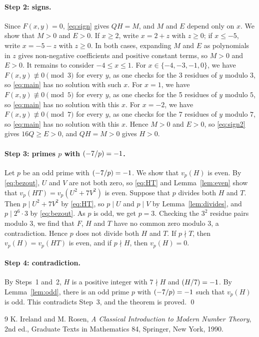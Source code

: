 \documentclass[11pt]{article}
\newcommand{\leg}[2]{\mathchoice{\biggl(\dfrac{#1}{#2}\biggr)}{(#1/#2)}{(#1/#2)}{(#1/#2)}}
\begin{document}
\paragraph{Step 2: signs.} Since $F(x,y)=0$, \eqref{eq:sign} gives $QH=M$, and $M$ and $E$ depend only on $x$. We show that $M>0$ and $E>0$. If $x\geq2$, write $x=2+z$ with $z\geq0$; if $x\leq-5$, write $x=-5-z$ with $z\geq0$. In both cases, expanding $M$ and $E$ as polynomials in $z$ gives non-negative coefficients and positive constant terms, so $M>0$ and $E>0$. It remains to consider $-4\leq x\leq1$. For $x\in\{-4,-3,-1,0\}$, we have $F(x,y)\not\equiv0\pmod{3}$ for every $y$, as one checks for the 3 residues of $y$ modulo $3$, so \eqref{eq:main} has no solution with such $x$. For $x=1$, we have $F(x,y)\not\equiv0\pmod{5}$ for every $y$, as one checks for the 5 residues of $y$ modulo $5$, so \eqref{eq:main} has no solution with this $x$. For $x=-2$, we have $F(x,y)\not\equiv0\pmod{7}$ for every $y$, as one checks for the 7 residues of $y$ modulo $7$, so \eqref{eq:main} has no solution with this $x$. Hence $M>0$ and $E>0$, so \eqref{eq:sign2} gives $16Q\geq E>0$, and $QH=M>0$ gives $H>0$.

\paragraph{\texorpdfstring{Step 3: primes $p$ with $\leg{-7}{p}=-1$.}{Step 3: inert primes.}} Let $p$ be an odd prime with $\leg{-7}{p}=-1$. We show that $v_p(H)$ is even. By \eqref{eq:bezout}, $U$ and $V$ are not both zero, so \eqref{eq:HT} and Lemma~\ref{lem:even} show that $v_p(HT)=v_p(U^2+7V^2)$ is even. Suppose that $p$ divides both $H$ and $T$. Then $p\mid U^2+7V^2$ by \eqref{eq:HT}, so $p\mid U$ and $p\mid V$ by Lemma~\ref{lem:divides}, and $p\mid 2^{6}\cdot 3$ by \eqref{eq:bezout}. As $p$ is odd, we get $p=3$. Checking the $3^2$ residue pairs modulo $3$, we find that $F$, $H$ and $T$ have no common zero modulo $3$, a contradiction. Hence $p$ does not divide both $H$ and $T$. If $p\nmid T$, then $v_p(H)=v_p(HT)$ is even, and if $p\nmid H$, then $v_p(H)=0$.

\paragraph{Step 4: contradiction.} By Steps~1 and~2, $H$ is a positive integer with $7\nmid H$ and $\leg{H}{7}=-1$. By Lemma~\ref{lem:odd}, there is an odd prime $p$ with $\leg{-7}{p}=-1$ such that $v_p(H)$ is odd. This contradicts Step~3, and the theorem is proved.
\qed

\begin{thebibliography}{9}
 K. Ireland and M. Rosen, \emph{A Classical Introduction to Modern Number Theory}, 2nd ed., Graduate Texts in Mathematics 84, Springer, New York, 1990.
\end{thebibliography}
\end{document}
